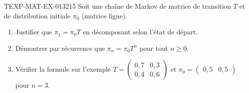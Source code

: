 \begin{exercice}{TEXP-MAT-EX-013}{2}{15}
Soit une chaîne de Markov de matrice de transition $T$ et de distribution
initiale $\pi_0$ (matrice ligne).
\begin{enumerate}
  \item Justifier que $\pi_1=\pi_0T$ en décomposant selon l'état de départ.
  \item Démontrer par récurrence que $\pi_n=\pi_0T^n$ pour tout $n\geq0$.
  \item Vérifier la formule sur l'exemple
        $T=\begin{pmatrix}0{,}7&0{,}3\\0{,}4&0{,}6\end{pmatrix}$ et
        $\pi_0=\begin{pmatrix}0{,}5&0{,}5\end{pmatrix}$ pour $n=3$.
\end{enumerate}
\end{exercice}
